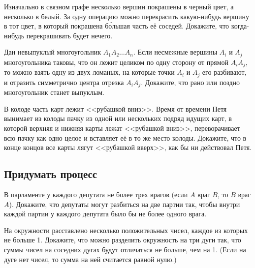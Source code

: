 \begin{problems}

\item
Изначально в связном графе несколько вершин покрашены в черный цвет, а
несколько в белый.
За одну операцию можно перекрасить какую-нибудь вершину в тот цвет, в который
покрашена б\'{о}льшая  часть её соседей.
Докажите, что когда-нибудь перекрашивать будет нечего.

\item
Дан невыпуклый многоугольник $A_1 A_2 \ldots A_n$.
Если несмежные вершины $A_i$ и $A_j$ многоугольника таковы, что он лежит
целиком по одну сторону от прямой $A_iA_j$, то можно взять одну из двух
ломаных, на которые точки $A_i$ и $A_j$ его разбивают, и отразить симметрично
центра отрезка $A_i A_j$.
Докажите, что рано или поздно многоугольник станет выпуклым.

\item
В колоде часть карт лежит <<рубашкой вниз>>.
Время от времени Петя вынимает из колоды пачку из одной или нескольких подряд
идущих карт, в которой верхняя и нижняя карты лежат <<рубашкой вниз>>,
переворачивает всю пачку как одно целое и вставляет её в то же место колоды.
Докажите, что в конце концов все карты лягут <<рубашкой вверх>>, как бы ни
действовал Петя.



\subsection*{Придумать процесс}

\item
В парламенте у каждого депутата не более трех врагов
(если $A$ враг $B$, то $B$ враг $A$).
Докажите, что депутаты могут разбиться на две партии так, чтобы внутри каждой
партии у каждого депутата было бы не более одного врага.

\item
На окружности расставлено несколько положительных чисел, каждое из которых
не больше 1.
Докажите, что можно разделить окружность на три дуги так, что суммы чисел на
соседних дугах будут отличаться не больше, чем на 1.
(Если на дуге нет чисел, то сумма на ней считается равной нулю.)

\end{problems}


